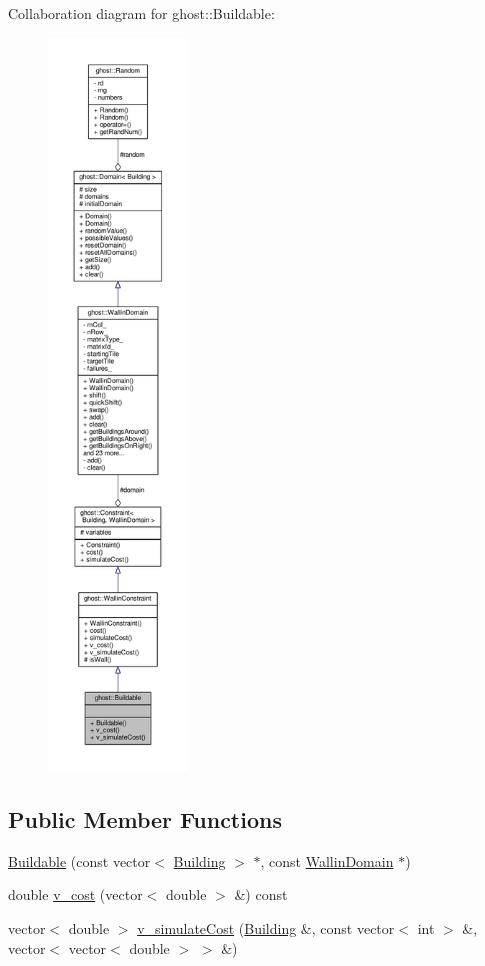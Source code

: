Collaboration diagram for ghost\-:\-:Buildable\-:\nopagebreak
\begin{figure}[H]
\begin{center}
\leavevmode
\includegraphics[height=550pt]{classghost_1_1Buildable__coll__graph}
\end{center}
\end{figure}
\subsection*{Public Member Functions}
\begin{DoxyCompactItemize}
\item 
\hyperlink{classghost_1_1Buildable_afb25530b221922dd29a0a5bd7cdd68c6}{Buildable} (const vector$<$ \hyperlink{classghost_1_1Building}{Building} $>$ $\ast$, const \hyperlink{classghost_1_1WallinDomain}{Wallin\-Domain} $\ast$)
\item 
double \hyperlink{classghost_1_1Buildable_a584162de15bdeb91c7f9a0d0a0fa3c87}{v\-\_\-cost} (vector$<$ double $>$ \&) const 
\item 
vector$<$ double $>$ \hyperlink{classghost_1_1Buildable_a29a10e97f82795bab71a11be3750b6f3}{v\-\_\-simulate\-Cost} (\hyperlink{classghost_1_1Building}{Building} \&, const vector$<$ int $>$ \&, vector$<$ vector$<$ double $>$ $>$ \&)
\end{DoxyCompactItemize}
